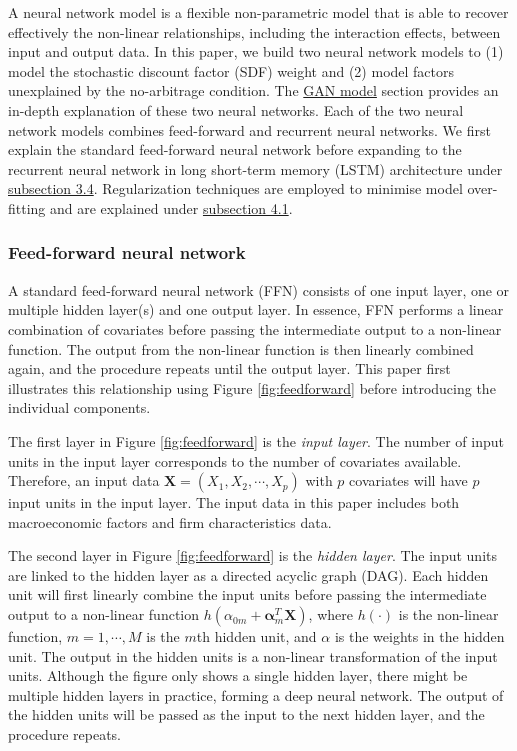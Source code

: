 \documentclass[12pt]{article}
\begin{document}
A neural network model is a flexible non-parametric
model that is able to recover effectively the non-linear
relationships, including the interaction effects, between
input and output data.
In this paper, we build two neural network models to (1) model
the stochastic discount factor (SDF) weight and (2) model
factors unexplained by the no-arbitrage condition. The \protect\hyperlink{gan_model}{GAN
model} section provides an in-depth explanation of
these two neural networks.
Each of the two neural network models combines feed-forward
and recurrent neural networks. We first explain the
standard feed-forward
neural network before expanding to the recurrent neural network
in long short-term memory (LSTM)
architecture under \protect\hyperlink{LSTM_model}{subsection 3.4}. Regularization techniques are
employed to minimise model over-fitting and are explained
under \protect\hyperlink{model_training}{subsection 4.1}.

\hypertarget{feed-forward-neural-network}{%
\subsubsection{Feed-forward neural network}\label{feed-forward-neural-network}}

A standard feed-forward neural network (FFN) consists of one input
layer, one or multiple hidden layer(s) and one output layer.
In essence, FFN performs a linear combination of covariates
before passing the intermediate output to a non-linear function.
The output from the non-linear function is then linearly
combined again, and the procedure repeats until the output
layer. This paper first illustrates this relationship using
Figure \ref{fig:feedforward} before introducing the
individual components.

The first layer in Figure \ref{fig:feedforward} is
the \emph{input layer}. The number of input units in the input
layer corresponds to the number of covariates available.
Therefore, an input data \(\mathbf{X} = (X_1, X_2, \cdots, X_p)\)
with \(p\) covariates will have \(p\) input units in the input
layer. The input data in this paper includes
both macroeconomic factors and firm characteristics data.

The second layer in Figure \ref{fig:feedforward} is the
\emph{hidden layer}. The input units are linked to the hidden
layer as a directed acyclic graph (DAG). Each hidden unit
will first linearly combine the input units before
passing the intermediate output to a non-linear function
\(h(\alpha_{0m} + \mathbf{\alpha}^T_m\mathbf{X})\),
where \(h(\cdot)\) is the non-linear function, \(m = 1, \cdots, M\) is the \(m\)th hidden unit, and \(\alpha\) is the
weights in the hidden unit.
The output in the hidden units is a non-linear
transformation of the input units.
Although the figure only shows a single hidden layer,
there might be multiple hidden layers in practice, forming a
deep neural network. The output of the hidden units will be
passed as the input to the next hidden layer, and the
procedure repeats.
\end{document}
